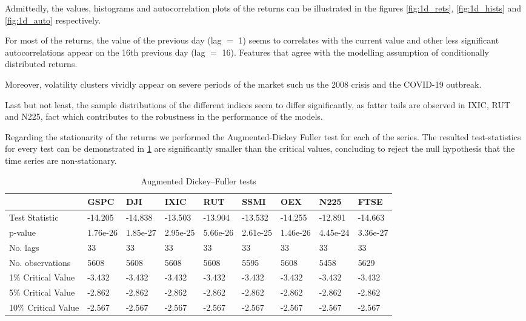 \documentclass[a4paper, oneside]{discothesis}
\begin{document}
Admittedly, the values, histograms and autocorrelation plots of the returns can be illustrated in the figures \ref{fig:1d_rets}, \ref{fig:1d_hists} and \ref{fig:1d_auto} respectively.

For most of the returns, the value of the previous day (lag $=$ 1) seems to correlates with the current value and other less significant autocorrelations appear on the 16th previous day (lag $=$ 16). Features that agree with the modelling assumption of conditionally distributed returns.

Moreover, volatility clusters vividly appear on severe periods of the market such us the 2008 crisis and the COVID-19 outbreak. 

Last but not least, the sample distributions of the different indices seem to differ significantly, as fatter tails are observed in IXIC, RUT and N225, fact which contributes to the robustness in the performance of the models.

Regarding the stationarity of the returns we performed the Augmented-Dickey Fuller test \cite{ADF} for each of the series. The resulted test-statistics for every test can be demonstrated in \ref{tb:ADF_table} are significantly smaller than the critical values, concluding to reject the null hypothesis that the time series are non-stationary.

\begin{table}[!ht]\label{tb:ADF_table}
    \scriptsize
    \centering
    \begin{tabular}{|p{1cm}||p{}|p{}|p{}|p{}|p{}|p{}|p{}|p{}|}
    \hline
        ~ & GSPC & DJI & IXIC & RUT & SSMI & OEX & N225 & FTSE \\ \hline\hline
        Test Statistic & -14.205 & -14.838 & -13.503 & -13.904 & -13.532 & -14.255 & -12.891 & -14.663 \\ \hline
        p-value & 1.76e-26&	1.85e-27&	2.95e-25&	5.66e-26&	2.61e-25&	1.46e-26&	4.45e-24&	3.36e-27 \\ \hline
        No. lags & 33 & 33 & 33 & 33 & 33 & 33 & 33 & 33 \\ \hline
        No. observations & 5608 & 5608 & 5608 & 5608 & 5595 & 5608 & 5458 & 5629 \\ \hline
        1\% Critical Value & -3.432 & -3.432 & -3.432 & -3.432 & -3.432 & -3.432 & -3.432 & -3.432 \\ \hline
        5\% Critical Value & -2.862 & -2.862 & -2.862 & -2.862 & -2.862 & -2.862 & -2.862 & -2.862 \\ \hline
        10\% Critical Value & -2.567 & -2.567 & -2.567 & -2.567 & -2.567 & -2.567 & -2.567 & -2.567 \\ \hline
    \end{tabular}
    \normalsize	
    \caption{Augmented Dickey–Fuller tests}
\end{table}
\end{document}
